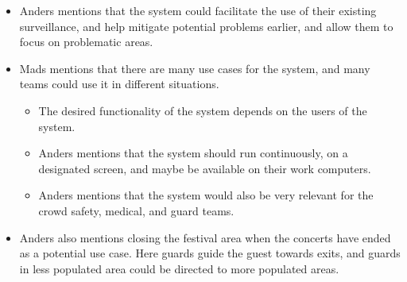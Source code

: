 \begin{itemize}
\begin{itemize}
    \end{itemize}
    \item Anders mentions that the system could facilitate the use of their existing surveillance, and help mitigate potential problems earlier, and allow them to focus on problematic areas.
    \item Mads mentions that there are many use cases for the system, and many teams could use it in different situations.
    \begin{itemize}
        \item The desired functionality of the system depends on the users of the system.
        \item Anders mentions that the system should run continuously, on a designated screen, and maybe be available on their work computers.
        \item Anders mentions that the system would also be very relevant for the crowd safety, medical, and guard teams.
    \end{itemize}
    \item Anders also mentions closing the festival area when the concerts have ended as a potential use case. Here guards guide the guest towards exits, and guards in less populated area could be directed to more populated areas.
\end{itemize}